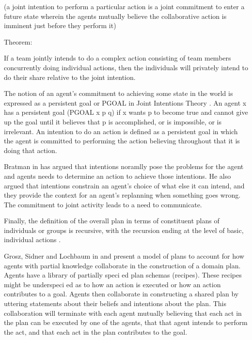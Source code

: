 \documentclass[11pt]{article}
\begin{document}
(a joint intention to perform a particular action is a joint commitment to enter
a future state wherein the agents mutually believe the collaborative action is
imminent just before they perform it)

Theorem:

If a team jointly intends to do a complex action consisting of team members
concurrently doing individual actions, then the individuals will privately
intend to do their share relative to the joint intention.

The notion of an agent’s commitment to achieving some state in the world is
expressed as a persistent goal or PGOAL in Joint Intentions Theory
\cite{cohen:intention-commitment}. An agent x has a persistent goal (PGOAL x p
q) if x wants p to become true and cannot give up the goal until it believes
that p is accomplished, or is impossible, or is irrelevant. An intention to do
an action is defined as a persistent goal in which the agent is committed to
performing the action believing throughout that it is doing that action.

Bratman in \cite{bratman:intentions-plans} has argued that intentions noramlly
pose the problems for the agent and agents needs to determine an action to
achieve those intentions. He also argued that intentions constrain an agent’s
choice of what else it can intend, and they provide the context for an agent’s
replanning when something goes wrong. The commitment to joint activity leads to
a need to communicate.

Finally, the definition of the overall plan in terms of constituent plans of
individuals or groups is recursive, with the recursion ending at the level of
basic, individual actions \cite{grosz:mice-menus}.

Grosz, Sidner and Lochbaum in \cite{grosz:plans-discourse} and
\cite{lochbaum:plan-models} present a model of plans to account for how agents
with partial knowledge collaborate in the construction of a domain plan. Agents
have a library of partially speci ed plan schemas (recipes). These recipes might
be underspeci ed as to how an action is executed or how an action contributes to
a goal. Agents then collaborate in constructing a shared plan by uttering
statements about their beliefs and intentions about the plan. This collaboration
will terminate with each agent mutually believing that each act in the plan can
be executed by one of the agents, that that agent intends to perform the act,
and that each act in the plan contributes to the goal.
\end{document}
